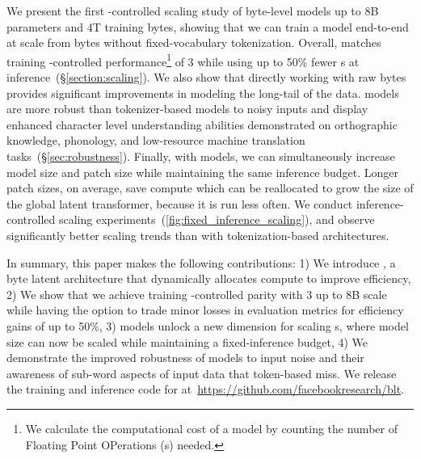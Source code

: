 \documentclass[]{fairmeta}
\begin{document}

We present the first \flop{}-controlled scaling study of byte-level models up to 8B parameters and 4T training bytes, showing that we can train a model end-to-end at scale from bytes without fixed-vocabulary tokenization. 
Overall, \model{} matches training \flop{}-controlled performance\footnote{We calculate the computational cost of a model by counting the number of Floating Point OPerations (\flop{}s) needed.} of \llama{} 3 while using up to 50\% fewer \flop{}s at inference~(\S\ref{section:scaling}).
We also show that directly working with raw bytes provides significant improvements in modeling the long-tail of the data. \model{} models are more robust than tokenizer-based models to noisy inputs and display enhanced character level understanding abilities demonstrated on orthographic knowledge, phonology, and low-resource machine translation tasks~(\S\ref{sec:robustness}).
Finally, with \model{} models, we can simultaneously increase model size and patch size  while maintaining the same inference \flop{} budget. Longer patch sizes, on average, save compute which can be reallocated to grow the size of the global latent transformer, because it is run less often. We conduct inference-\flop{} controlled scaling experiments~(\autoref{fig:fixed_inference_scaling}), and observe significantly better scaling trends than with tokenization-based architectures. 



In summary, this paper makes the following contributions:
1) We introduce \model{}, a byte latent \llm{} architecture that dynamically allocates compute to improve \flop{} efficiency,
2) We show that we achieve training \flop{}-controlled parity with \llama{} 3 up to 8B scale while having the option to trade minor losses in evaluation metrics for \flop{} efficiency gains of up to 50\%, 3) \model{} models unlock a new dimension for scaling \llm{}s, where model size can now be scaled while maintaining a fixed-inference budget, 4) We demonstrate the improved robustness of \model{} models to input noise and their awareness of sub-word aspects of input data that token-based \llms{} miss.
We release the training and inference code for \model{}  at~\url{https://github.com/facebookresearch/blt}.
\end{document}
